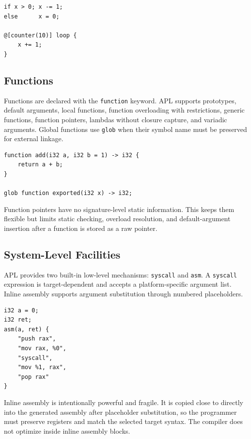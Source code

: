 \documentclass[10pt,twocolumn]{article}
\begin{document}
\begin{lstlisting}[language=APL, caption={Control flow.}]
if x > 0; x -= 1;
else      x = 0;

@[counter(10)] loop {
    x += 1;
}
\end{lstlisting}

\subsection{Functions}
\par Functions are declared with the \texttt{function} keyword. APL supports prototypes, default arguments, local functions, function overloading with restrictions, generic functions, function pointers, lambdas without closure capture, and variadic arguments. Global functions use \texttt{glob} when their symbol name must be preserved for external linkage.

\begin{lstlisting}[language=APL, caption={Function forms.}]
function add(i32 a, i32 b = 1) -> i32 {
    return a + b;
}

glob function exported(i32 x) -> i32;
\end{lstlisting}

\par Function pointers have no signature-level static information. This keeps them flexible but limits static checking, overload resolution, and default-argument insertion after a function is stored as a raw pointer.

\subsection{System-Level Facilities}
\par APL provides two built-in low-level mechanisms: \texttt{syscall} and \texttt{asm}. A \texttt{syscall} expression is target-dependent and accepts a platform-specific argument list. Inline assembly supports argument substitution through numbered placeholders.

\begin{lstlisting}[language=APL, caption={Inline assembly with placeholders.}]
i32 a = 0;
i32 ret;
asm(a, ret) {
    "push rax",
    "mov rax, %0",
    "syscall",
    "mov %1, rax",
    "pop rax"
}
\end{lstlisting}

\par Inline assembly is intentionally powerful and fragile. It is copied close to directly into the generated assembly after placeholder substitution, so the programmer must preserve registers and match the selected target syntax. The compiler does not optimize inside inline assembly blocks.
\end{document}
